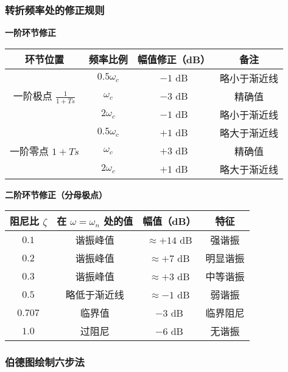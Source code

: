 \subsubsection{转折频率处的修正规则}

\textbf{一阶环节修正}

\begin{center}
\begin{tabular}{|c|c|c|c|}
\hline
\textbf{环节位置} & \textbf{频率比例} & \textbf{幅值修正（dB）} & \textbf{备注} \\
\hline
\multirow{3}{*}{一阶极点 $\frac{1}{1+Ts}$} & $0.5\omega_c$ & $-1$ dB & 略小于渐近线 \\
\cline{2-4}
& $\omega_c$ & $-3$ dB & 精确值 \\
\cline{2-4}
& $2\omega_c$ & $-1$ dB & 略小于渐近线 \\
\hline
\multirow{3}{*}{一阶零点 $1+Ts$} & $0.5\omega_c$ & $+1$ dB & 略大于渐近线 \\
\cline{2-4}
& $\omega_c$ & $+3$ dB & 精确值 \\
\cline{2-4}
& $2\omega_c$ & $+1$ dB & 略大于渐近线 \\
\hline
\end{tabular}
\end{center}

\textbf{二阶环节修正（分母极点）}

\begin{center}
\begin{tabular}{|c|c|c|c|}
\hline
\textbf{阻尼比 $\zeta$} & \textbf{在 $\omega=\omega_n$ 处的值} & \textbf{幅值（dB）} & \textbf{特征} \\
\hline
$0.1$ & 谐振峰值 & $\approx +14$ dB & 强谐振 \\
\hline
$0.2$ & 谐振峰值 & $\approx +7$ dB & 明显谐振 \\
\hline
$0.3$ & 谐振峰值 & $\approx +3$ dB & 中等谐振 \\
\hline
$0.5$ & 略低于渐近线 & $\approx -1$ dB & 弱谐振 \\
\hline
$0.707$ & 临界值 & $-3$ dB & 临界阻尼 \\
\hline
$1.0$ & 过阻尼 & $-6$ dB & 无谐振 \\
\hline
\end{tabular}
\end{center}

\subsubsection{伯德图绘制六步法}

